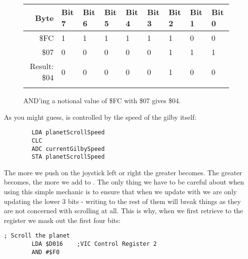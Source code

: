\begin{figure}[H]
  {
    \setlength{\tabcolsep}{3.0pt}
    \setlength\cmidrulewidth{\heavyrulewidth} %
    \begin{adjustbox}{width=6cm,center}

      \begin{tabular}{rllllllll}
        \toprule
        Byte & Bit 7 & Bit 6 & Bit 5 & Bit 4 & Bit 3 & Bit 2 & Bit 1 & Bit 0        \\
        \midrule
        \$FC & 1 & 1 & 1 & 1 & 1 & 1 & 0 & 0 \\
        \$07 & 0 & 0 & 0 & 0 & 0 & 1 & 1 & 1 \\
        \midrule
        Result: \$04 & 0 & 0 & 0 & 0 & 0 & 1 & 0 & 0 \\
        \addlinespace
        \bottomrule
      \end{tabular}

    \end{adjustbox}

  }\caption*{AND'ing a notional value of \$FC with \$07 gives \$04.}
\end{figure}

As you might guess,  is controlled by the speed of the gilby itself:

\begin{lstlisting}
        LDA planetScrollSpeed
        CLC
        ADC currentGilbySpeed
        STA planetScrollSpeed
\end{lstlisting}

The more we push on the joystick left or right the greater  becomes. The
greater  becomes, the more we add to . The only
thing we have to be careful about when using this simple mechanic is to ensure that when we update
 with  we are only updating the lower 3 bits - writing to the
rest of them will break things as they are not concerned with scrolling at all. This is why, when
we first retrieve  to the  register we mask out the first four bits:

\begin{lstlisting}[]
        ; Scroll the planet
        LDA $D016    ;VIC Control Register 2
        AND #$F0
\end{lstlisting}


